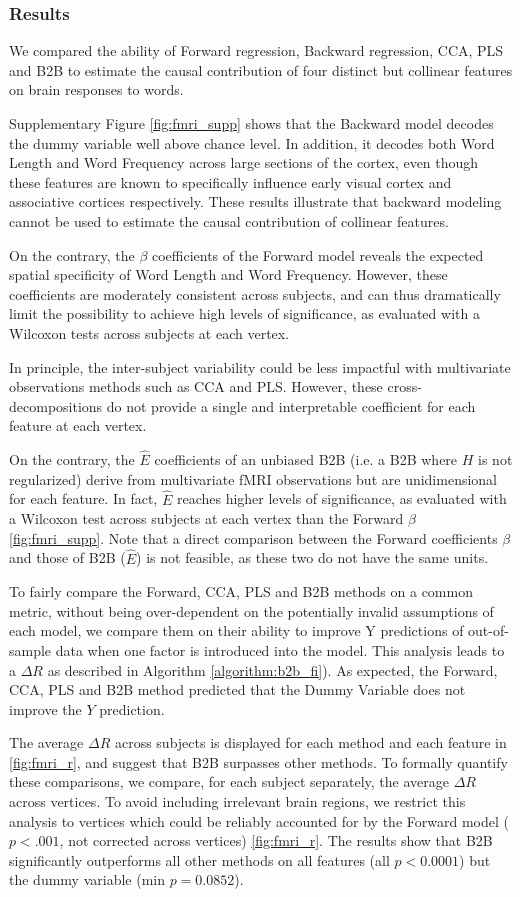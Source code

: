 \subsubsection{Results}
We compared the ability of Forward regression, Backward regression, CCA, PLS
and B2B to estimate the causal contribution of four distinct but collinear
features on brain responses to words.

Supplementary Figure \ref{fig:fmri_supp} shows that the Backward model decodes
the dummy variable well above chance level. In addition, it decodes both Word
Length and Word Frequency across large sections of the cortex, even though
these features are known to specifically influence early visual cortex and
associative cortices respectively. These results illustrate that backward
modeling cannot be used to estimate the causal contribution of collinear
features.

On the contrary, the $\beta$ coefficients of the Forward model reveals the
expected spatial specificity of Word Length and Word Frequency. However, these
coefficients are moderately consistent across subjects, and can thus
dramatically limit the possibility to achieve high levels of
significance, as evaluated with a Wilcoxon tests across subjects at each vertex.

In principle, the inter-subject variability could be less impactful with
multivariate observations methods such as CCA and PLS. However, these
cross-decompositions do not provide a single and interpretable coefficient
for each feature at each vertex.

On the contrary, the $\hat E$ coefficients of an unbiased B2B (i.e. a B2B where
$H$ is not regularized) derive from multivariate fMRI observations but are
unidimensional for each feature. In fact, $\hat E$ reaches higher levels of
significance, as evaluated with a Wilcoxon test across subjects at each vertex
than the Forward $\beta$ \ref{fig:fmri_supp}. Note that a direct
comparison between the Forward coefficients $\beta$ and those of B2B ($\hat E$)
is not feasible, as these two do not have the same units.

To fairly compare the Forward, CCA, PLS and B2B methods on a common metric,
without being over-dependent on the
potentially invalid assumptions of each model, we compare them on their ability
to improve Y
predictions of out-of-sample data when one factor is introduced into the model.
This analysis leads to a $\Delta R$ as described in Algorithm
\ref{algorithm:b2b_fi}). As expected, the Forward, CCA, PLS
and B2B method predicted that the Dummy Variable does not improve the $Y$
prediction.

The average $\Delta R$ across subjects is displayed for each method and each
feature in \ref{fig:fmri_r}, and suggest that B2B surpasses other methods.
To formally quantify these comparisons, we compare, for each subject separately,
the average $\Delta R$ across vertices. To avoid including irrelevant brain
regions, we restrict this analysis to vertices which could be reliably accounted
for by the Forward model ($p<.001$, not corrected across vertices)
\ref{fig:fmri_r}. The results show that B2B significantly outperforms all
other methods on all features (all $p<0.0001$) but the dummy variable
(min $p=0.0852$).
